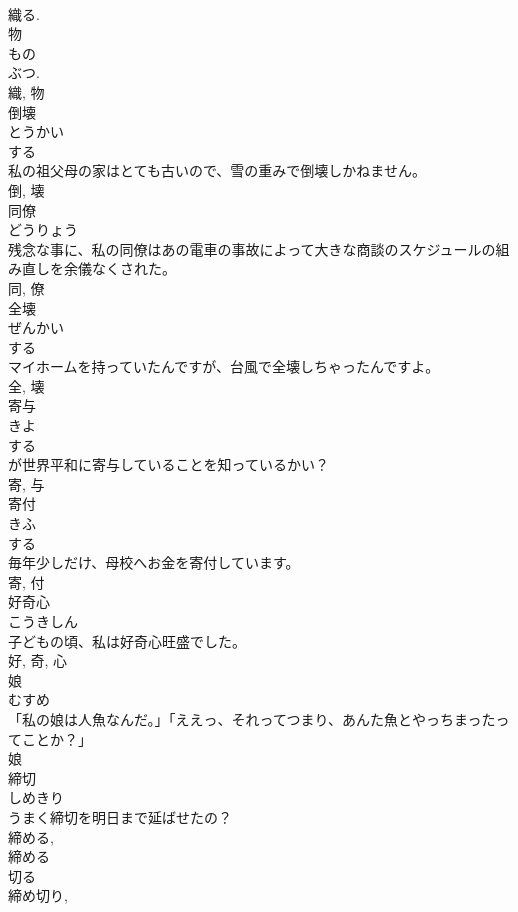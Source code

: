 \documentclass[8pt]{extreport}
\begin{document}
\begin{CJK}{UTF8}{min}
\\	織る. 
\\	物 
\\	もの 
\\	ぶつ. 
\\	織, 物	
\\	倒壊	
\\	とうかい	
\\	する 
\\	私の祖父母の家はとても古いので、雪の重みで倒壊しかねません。	
\\	倒, 壊	
\\	同僚	
\\	どうりょう	
\\	残念な事に、私の同僚はあの電車の事故によって大きな商談のスケジュールの組み直しを余儀なくされた。	
\\	同, 僚	
\\	全壊	
\\	ぜんかい	
\\	する 
\\	マイホームを持っていたんですが、台風で全壊しちゃったんですよ。	
\\	全, 壊	
\\	寄与	
\\	きよ	
\\	する 
\\	が世界平和に寄与していることを知っているかい？	
\\	寄, 与	
\\	寄付	
\\	きふ	
\\	する 
\\	毎年少しだけ、母校へお金を寄付しています。	
\\	寄, 付	
\\	好奇心	
\\	こうきしん	
\\	子どもの頃、私は好奇心旺盛でした。	
\\	好, 奇, 心	
\\	娘	
\\	むすめ	
\\	「私の娘は人魚なんだ。」「ええっ、それってつまり、あんた魚とやっちまったってことか？」	
\\	娘	
\\	締切	
\\	しめきり	
\\	うまく締切を明日まで延ばせたの？	
\\	締める, 
\\	締める 
\\	切る 
\\	締め切り, 

\end{CJK}
\end{document}
